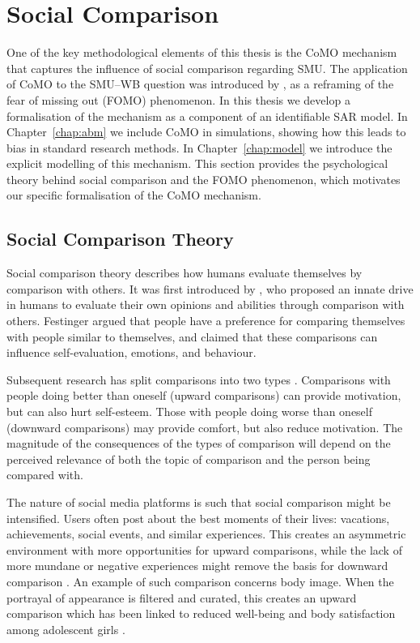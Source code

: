 \section{Social Comparison}
\label{sec:bg:social_comparison}
One of the key methodological elements of this thesis is the CoMO mechanism that captures the influence of social comparison regarding SMU\@. The application of CoMO to the SMU--WB question was introduced by \textcite[Eqs.~1--2]{DahlFoldnesGronneberg2024}, as a reframing of the fear of missing out (FOMO) phenomenon. In this thesis we develop a formalisation of the mechanism as a component of an identifiable SAR model. In Chapter~\ref{chap:abm} we include CoMO in simulations, showing how this leads to bias in standard research methods. In Chapter~\ref{chap:model} we introduce the explicit modelling of this mechanism. This section provides the psychological theory behind social comparison and the FOMO phenomenon, which motivates our specific formalisation of the CoMO mechanism.

\subsection{Social Comparison Theory}

Social comparison theory describes how humans evaluate themselves by comparison with others. It was first introduced by \textcite{Festinger1954}, who proposed an innate drive in humans to evaluate their own opinions and abilities through comparison with others. Festinger argued that people have a preference for comparing themselves with people similar to themselves, and claimed that these comparisons can influence self-evaluation, emotions, and behaviour.

Subsequent research has split comparisons into two types \parencite{Wills1981, Wood1989}. Comparisons with people doing better than oneself (upward comparisons) can provide motivation, but can also hurt self-esteem. Those with people doing worse than oneself (downward comparisons) may provide comfort, but also reduce motivation. The magnitude of the consequences of the types of comparison will depend on the perceived relevance of both the topic of comparison and the person being compared with.

The nature of social media platforms is such that social comparison might be intensified. Users often post about the best moments of their lives: vacations, achievements, social events, and similar experiences. This creates an asymmetric environment with more opportunities for upward comparisons, while the lack of more mundane or negative experiences might remove the basis for downward comparison \parencite[Ch.~6]{Haidt2024}. An example of such comparison concerns body image. When the portrayal of appearance is filtered and curated, this creates an upward comparison which has been linked to reduced well-being and body satisfaction among adolescent girls \parencite{Fardouly2015}.

